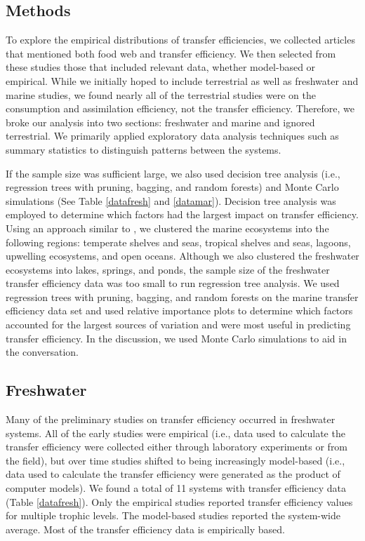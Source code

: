 \documentclass[oneside,12pt,final]{sty/ucthesis-CA2012}
\let\cite\citep                             %
\begin{document}
\begin{mainmatter}
\section*{Methods}
To explore the empirical distributions of transfer efficiencies, we collected  articles that mentioned both food web and transfer efficiency. We then selected from these studies those that included relevant data, whether model-based or empirical. While we initially hoped to include terrestrial as well as freshwater and marine studies, we found nearly all of the terrestrial studies were on the consumption and assimilation efficiency, not the transfer efficiency. Therefore, we broke our analysis into two sections: freshwater and marine and ignored terrestrial. We primarily applied exploratory data analysis techniques such as summary statistics to distinguish patterns between the systems. 

\vspace{5mm}

If the sample size was sufficient large, we also used decision tree analysis (i.e., regression trees with pruning, bagging, and random forests) and Monte Carlo simulations (See Table \ref{datafresh} and \ref{datamar}). Decision tree analysis was employed to determine which factors had the largest impact on transfer efficiency. Using an approach similar to \cite{libralato2008novel}, we clustered the marine ecosystems into the following regions: temperate shelves and seas, tropical shelves and seas, lagoons, upwelling ecosystems, and open oceans. Although we also clustered the freshwater ecosystems into lakes, springs, and ponds, the sample size of the freshwater transfer efficiency data was too small to run regression tree analysis. We used regression trees with pruning, bagging, and random forests on the marine transfer efficiency data set and used relative importance plots to determine which factors accounted for the largest sources of variation and were most useful in predicting transfer efficiency. In the discussion, we used Monte Carlo simulations to aid in the conversation.

\subsection*{Freshwater}
Many of the preliminary studies on transfer efficiency occurred in freshwater systems. All of the early studies were empirical (i.e., data used to calculate the transfer efficiency were collected either through laboratory experiments or from the field), but over time studies shifted to being increasingly model-based (i.e., data used to calculate the transfer efficiency were generated as the product of computer models). We found a total of 11 systems with transfer efficiency data (Table \ref{datafresh}). Only the empirical studies reported transfer efficiency values for multiple trophic levels. The model-based studies reported the system-wide average. Most of the transfer efficiency data is empirically based. 


\end{mainmatter}
\end{document}
